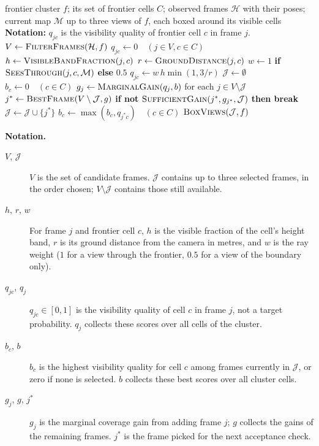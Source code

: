 \documentclass{article}
\begin{document}
\begin{algorithm}[H]
\caption{\textsc{SelectViews}: Representative Frames for One Frontier Cluster}
\begin{algorithmic}[1]
\Require frontier cluster $f$; its set of frontier cells $C$; observed frames $\mathcal H$ with their poses; current map $\mathcal M$
\Ensure up to three views of $f$, each boxed around its visible cells
\Statex \textbf{Notation:} $q_{jc}$ is the visibility quality of frontier cell $c$ in frame $j$.
\State $V\gets\textsc{FilterFrames}(\mathcal H,f)$
\State $q_{jc}\gets 0\quad(j\in V,c\in C)$
    \State $h\gets\textsc{VisibleBandFraction}(j,c)$
    \State $r\gets\textsc{GroundDistance}(j,c)$
    \State $w\gets 1$ \textbf{if} $\textsc{SeesThrough}(j,c,\mathcal M)$ \textbf{else} $0.5$
    \State $q_{jc}\gets w\,h\min(1,3/r)$
\EndFor
\State $\mathcal J\gets\emptyset$
\State $b_c\gets 0\quad(c\in C)$
    \State $g_j\gets\textsc{MarginalGain}(q_j,b)$ for each $j\in V\setminus\mathcal J$
    \State $j^*\gets\textsc{BestFrame}(V\setminus\mathcal J,g)$
    \State \textbf{if not} $\textsc{SufficientGain}(j^*,g_{j^*},\mathcal J)$ \textbf{then break}
    \State $\mathcal J\gets\mathcal J\cup\{j^*\}$
    \State $b_c\gets\max(b_c,q_{j^*c})\quad(c\in C)$
\EndWhile
\State \Return $\textsc{BoxViews}(\mathcal J,f)$
\end{algorithmic}
\end{algorithm}

\noindent\textbf{Notation.}
\begin{description}
\item[$V$, $\mathcal J$] $V$ is the set of candidate frames. $\mathcal J$ contains up to three selected frames, in the order chosen; $V\setminus\mathcal J$ contains those still available.
\item[$h$, $r$, $w$] For frame $j$ and frontier cell $c$, $h$ is the visible fraction of the cell's height band, $r$ is its ground distance from the camera in metres, and $w$ is the ray weight ($1$ for a view through the frontier, $0.5$ for a view of the boundary only).
\item[$q_{jc}$, $q_j$] $q_{jc}\in[0,1]$ is the visibility quality of cell $c$ in frame $j$, not a target probability. $q_j$ collects these scores over all cells of the cluster.
\item[$b_c$, $b$] $b_c$ is the highest visibility quality for cell $c$ among frames currently in $\mathcal J$, or zero if none is selected. $b$ collects these best scores over all cluster cells.
\item[$g_j$, $g$, $j^*$] $g_j$ is the marginal coverage gain from adding frame $j$; $g$ collects the gains of the remaining frames. $j^*$ is the frame picked for the next acceptance check.
\end{description}
\end{document}
